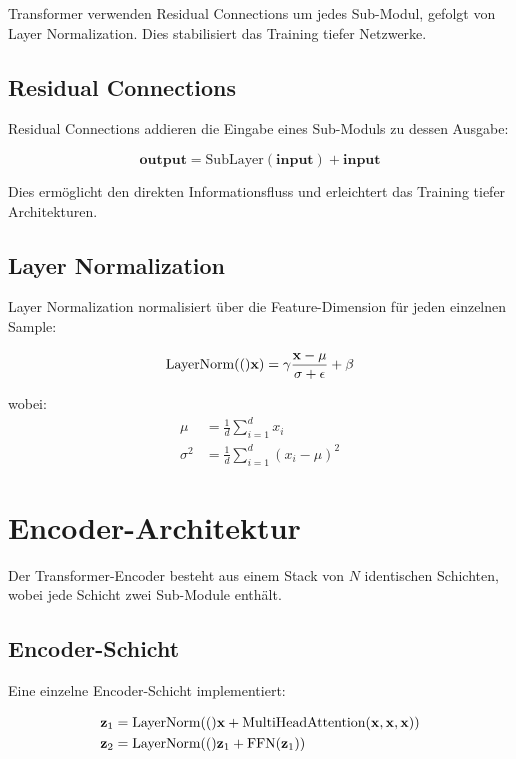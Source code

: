 Transformer verwenden Residual Connections um jedes Sub-Modul, gefolgt von Layer Normalization. Dies stabilisiert das Training tiefer Netzwerke.

\subsection{Residual Connections}

Residual Connections addieren die Eingabe eines Sub-Moduls zu dessen Ausgabe:

\begin{equation}
\mathbf{output} = \text{SubLayer}(\mathbf{input}) + \mathbf{input}
\end{equation}

Dies ermöglicht den direkten Informationsfluss und erleichtert das Training tiefer Architekturen.

\subsection{Layer Normalization}

Layer Normalization normalisiert über die Feature-Dimension für jeden einzelnen Sample:

\begin{equation}
\text{LayerNorm}(()\mathbf{x}) = \gamma \frac{\mathbf{x} - \mu}{\sigma + \epsilon} + \beta
\end{equation}

wobei:
\begin{align}
\mu &= \frac{1}{d} \sum_{i=1}^{d} x_i \\
\sigma^2 &= \frac{1}{d} \sum_{i=1}^{d} (x_i - \mu)^2
\end{align}

\section{Encoder-Architektur}

Der Transformer-Encoder besteht aus einem Stack von $N$ identischen Schichten, wobei jede Schicht zwei Sub-Module enthält.

\subsection{Encoder-Schicht}

Eine einzelne Encoder-Schicht implementiert:

\begin{align}
\mathbf{z}_1 &= \text{LayerNorm}(()\mathbf{x} + \text{MultiHeadAttention}(\mathbf{x}, \mathbf{x}, \mathbf{x})) \\
\mathbf{z}_2 &= \text{LayerNorm}(()\mathbf{z}_1 + \text{FFN}(\mathbf{z}_1))
\end{align}

